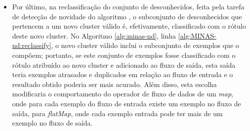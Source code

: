 \begin{itemize}
  \item Por último, na reclassificação do conjunto de desconhecidos,
  feita pela tarefa de detecção de novidade do algoritmo \minas, o subconjunto de
  desconhecidos que pertencem a um novo cluster válido é, efetivamente,
  classificado com o rótulo deste novo cluster.
  No Algoritmo \ref{alg:minas-nd}, linha \ref{alg:MINAS-nd:reclassify},
  o novo cluster válido inclui o subconjunto de exemplos que o compõem;
  portanto, se este conjunto de exemplos fosse classificado com o rótulo atribuído ao
  novo cluster e adicionado ao fluxo de saída, esta saída teria exemplos
  atrasados e duplicados em relação ao fluxo de entrada e o resultado obtido
  poderia ser mais acurado. %
  Além disso, esta escolha modificaria o comportamento do operador de fluxo de
  dados de um \emph{map}, onde para cada exemplo do fluxo de entrada existe um
  exemplo no fluxo de saída, para \emph{flatMap}, onde cada exemplo entrada pode
  ter mais de um exemplo no fluxo de saída.

\end{itemize}


\newcommand{\source}{módulo auxiliar \emph{source}\xspace}
\newcommand{\sink}{módulo auxiliar \emph{sink}\xspace}

\newcommand{\offline}{módulo treinamento\xspace}
\newcommand{\classify}{módulo classificador\xspace}
\newcommand{\detector}{módulo detector de novidades\xspace}


